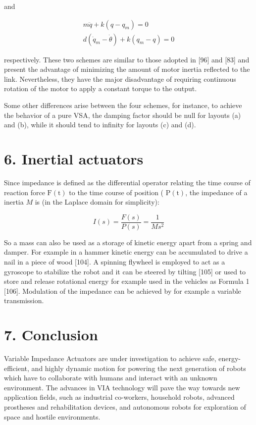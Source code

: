 \documentclass[10pt]{article}
\begin{document}
and


\begin{gather*}
m \ddot{q}+k\left(q-q_{m}\right)=0 \\
d\left(\dot{q}_{m}-\dot{\theta}\right)+k\left(q_{m}-q\right)=0 \tag{10}
\end{gather*}


respectively. These two schemes are similar to those adopted in [96] and [83] and present the advantage of minimizing the amount of motor inertia reflected to the link. Nevertheless, they have the major disadvantage of requiring continuous rotation of the motor to apply a constant torque to the output.

Some other differences arise between the four schemes, for instance, to achieve the behavior of a pure VSA, the damping factor should be null for layouts (a) and (b), while it should tend to infinity for layouts (c) and (d).

\section*{6. Inertial actuators}
Since impedance is defined as the differential operator relating the time course of reaction force $\mathrm{F}(\mathrm{t})$ to the time course of position ( $\mathrm{P}(\mathrm{t})$, the impedance of a inertia $M$ is (in the Laplace domain for simplicity):


\begin{equation*}
I(s)=\frac{F(s)}{P(s)}=\frac{1}{M s^{2}} \tag{11}
\end{equation*}


So a mass can also be used as a storage of kinetic energy apart from a spring and damper. For example in a hammer kinetic energy can be accumulated to drive a nail in a piece of wood [104]. A spinning flywheel is employed to act as a gyroscope to stabilize the robot and it can be steered by tilting [105] or used to store and release rotational energy for example used in the vehicles as Formula 1 [106]. Modulation of the impedance can be achieved by for example a variable transmission.

\section*{7. Conclusion}
Variable Impedance Actuators are under investigation to achieve safe, energy-efficient, and highly dynamic motion for powering the next generation of robots which have to collaborate with humans and interact with an unknown environment. The advances in VIA technology will pave the way towards new application fields, such as industrial co-workers, household robots, advanced prostheses and rehabilitation devices, and autonomous robots for exploration of space and hostile environments.
\end{document}
